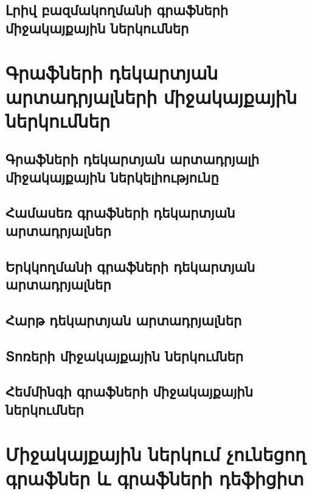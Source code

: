 \documentclass[a4paper,12pt,final]{article}
\let\stdsection\section
\renewcommand\section{\newpage\stdsection}
\begin{document}
\subsection{Լրիվ բազմակողմանի գրաֆների միջակայքային ներկումներ}




\section{Գրաֆների դեկարտյան արտադրյալների միջակայքային ներկումներ}

\subsection{Գրաֆների դեկարտյան արտադրյալի միջակայքային ներկելիությունը}


\subsection{Համասեռ գրաֆների դեկարտյան արտադրյալներ}


\subsection{Երկկողմանի գրաֆների դեկարտյան արտադրյալներ}


\subsection{Հարթ դեկարտյան արտադրյալներ}


\subsection{Տոռերի միջակայքային ներկումներ}


\subsection{Հեմմինգի գրաֆների միջակայքային ներկումներ}




\section{Միջակայքային ներկում չունեցող գրաֆներ և գրաֆների դեֆիցիտ}

\end{document}
